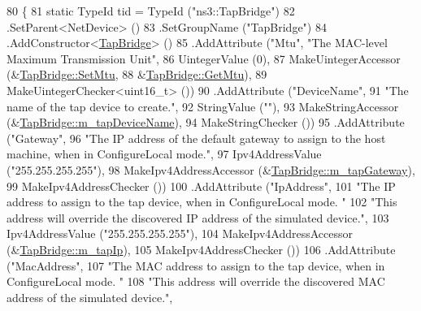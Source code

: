 \begin{DoxyCode}
80 \{
81   \textcolor{keyword}{static} TypeId tid = TypeId (\textcolor{stringliteral}{"ns3::TapBridge"})
82     .SetParent<NetDevice> ()
83     .SetGroupName (\textcolor{stringliteral}{"TapBridge"})
84     .AddConstructor<\hyperlink{classns3_1_1TapBridge_a59285065e82d8ba63306846fc4082f4b}{TapBridge}> ()
85     .AddAttribute (\textcolor{stringliteral}{"Mtu"}, \textcolor{stringliteral}{"The MAC-level Maximum Transmission Unit"},
86                    UintegerValue (0),
87                    MakeUintegerAccessor (&\hyperlink{classns3_1_1TapBridge_af41aca6484197a8a139b8db0fbcb6b79}{TapBridge::SetMtu},
88                                          &\hyperlink{classns3_1_1TapBridge_a9c10575ce501dfa92da9f45b32891407}{TapBridge::GetMtu}),
89                    MakeUintegerChecker<uint16\_t> ())
90     .AddAttribute (\textcolor{stringliteral}{"DeviceName"}, 
91                    \textcolor{stringliteral}{"The name of the tap device to create."},
92                    StringValue (\textcolor{stringliteral}{""}),
93                    MakeStringAccessor (&\hyperlink{classns3_1_1TapBridge_af255e0f837eb4dd30c4de28448f862f6}{TapBridge::m\_tapDeviceName}),
94                    MakeStringChecker ())
95     .AddAttribute (\textcolor{stringliteral}{"Gateway"}, 
96                    \textcolor{stringliteral}{"The IP address of the default gateway to assign to the host machine, when in
       ConfigureLocal mode."},
97                    Ipv4AddressValue (\textcolor{stringliteral}{"255.255.255.255"}),
98                    MakeIpv4AddressAccessor (&\hyperlink{classns3_1_1TapBridge_ad90dad655607615d92822a361ac21fb1}{TapBridge::m\_tapGateway}),
99                    MakeIpv4AddressChecker ())
100     .AddAttribute (\textcolor{stringliteral}{"IpAddress"}, 
101                    \textcolor{stringliteral}{"The IP address to assign to the tap device, when in ConfigureLocal mode.  "}
102                    \textcolor{stringliteral}{"This address will override the discovered IP address of the simulated device."},
103                    Ipv4AddressValue (\textcolor{stringliteral}{"255.255.255.255"}),
104                    MakeIpv4AddressAccessor (&\hyperlink{classns3_1_1TapBridge_a8cfe2b69cef36dbf048cb9006318b41b}{TapBridge::m\_tapIp}),
105                    MakeIpv4AddressChecker ())
106     .AddAttribute (\textcolor{stringliteral}{"MacAddress"}, 
107                    \textcolor{stringliteral}{"The MAC address to assign to the tap device, when in ConfigureLocal mode.  "}
108                    \textcolor{stringliteral}{"This address will override the discovered MAC address of the simulated device."},

\end{DoxyCode}
